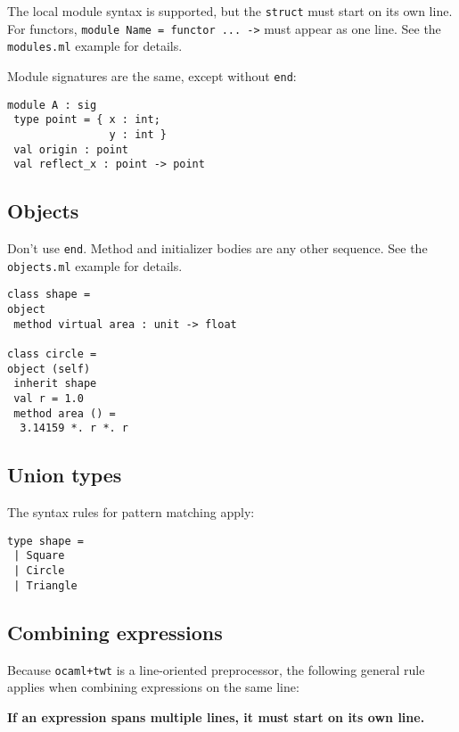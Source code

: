 \documentclass{article}
\begin{document}
\noindent The local module syntax is supported, but the {\tt struct} must start on its own line. For functors, {\tt module Name = functor ... ->} must appear as one line. See the {\tt modules.ml} example for details.

\noindent Module signatures are the same, except without {\tt end}:

\begin{verbatim}
module A : sig
 type point = { x : int;
                y : int }
 val origin : point
 val reflect_x : point -> point
\end{verbatim}

\subsection*{Objects}

\noindent Don't use {\tt end}. Method and initializer bodies are any other sequence. See the {\tt objects.ml} example for details.

\begin{verbatim}
class shape =
object
 method virtual area : unit -> float
 
class circle =
object (self)
 inherit shape
 val r = 1.0
 method area () =
  3.14159 *. r *. r
\end{verbatim}

\subsection*{Union types}

\noindent The syntax rules for pattern matching apply:

\begin{verbatim}
type shape =
 | Square
 | Circle
 | Triangle
\end{verbatim}

\subsection*{Combining expressions}

\noindent Because {\tt ocaml+twt} is a line-oriented preprocessor, the following general rule applies when combining expressions on the same line:

\vspace{0.5cm}

\noindent \textbf{If an expression spans multiple lines, it must start on its own line.}

\vspace{0.5cm}
\end{document}
